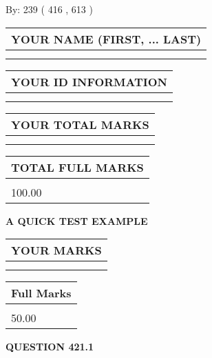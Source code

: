 \documentclass[12pt]{article}
\begin{document}
   
\hspace{1.0in} By: 
 239 ( 416 ,  613 )
   
   
   
   
\newpage 
\setcounter{page}{ 
   421001 } 
   
   
   
   
\noindent\begin{tabular}{|l|}
\hline
YOUR NAME (FIRST, ... LAST)  \\
\hline
 \\ 
 \\ 
\hline
\end{tabular}
\hspace{0.05in} \begin{tabular}{|l|}
\hline
 YOUR   ID   INFORMATION  \\
\hline
 \\ 
 \\ 
\hline
\end{tabular}
   
   
\vspace{0.2in}\noindent\begin{tabular}{|l|}
\hline
YOUR TOTAL MARKS  \\
\hline
 \\ 
 \\ 
\hline
\end{tabular}
\hspace{0.05in} \begin{tabular}{|l|}
\hline
TOTAL FULL MARKS  \\
\hline
 \\ 
100.00 \\
\hline
\end{tabular}
   
   
 \vspace{0.2in}
{\LARGE {\textbf{ A QUICK TEST EXAMPLE}}}
   
   
  
\vspace{0.2in}
  
\noindent\begin{tabular}{|l|}
\hline
 YOUR MARKS  \\
\hline
 \\ 
 \\ 
\hline
\end{tabular}
\hspace{0.05in} \begin{tabular}{|l|}
\hline
 Full Marks  \\
\hline
 \\ 
50.00 \\
\hline
\end{tabular}
{\textbf{\Large{QUESTION
421.1 
}}}
  
\end{document}
